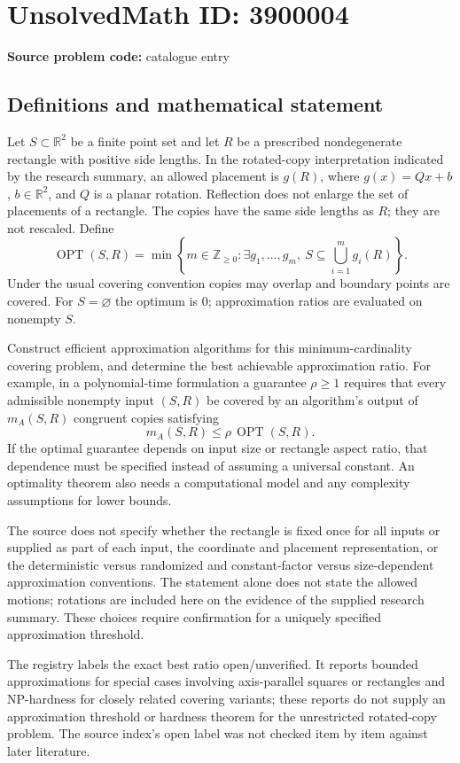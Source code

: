 \documentclass[11pt]{article}
\begin{document}
\section*{UnsolvedMath ID: 3900004}
\textbf{Source problem code:} catalogue entry
\subsection{Definitions and mathematical statement}
Let \(S\subset\mathbb R^2\) be a finite point set and let \(R\) be a prescribed nondegenerate rectangle with positive side lengths. In the rotated-copy interpretation indicated by the research summary, an allowed placement is \(g(R)\), where \(g(x)=Qx+b\), \(b\in\mathbb R^2\), and \(Q\) is a planar rotation. Reflection does not enlarge the set of placements of a rectangle. The copies have the same side lengths as \(R\); they are not rescaled. Define
\[
 \operatorname{OPT}(S,R)=\min\left\{m\in\mathbb Z_{\ge0}:\exists g_1,\ldots,g_m,
 \ S\subseteq\bigcup_{i=1}^m g_i(R)\right\}.
\]
Under the usual covering convention copies may overlap and boundary points are covered. For \(S=\varnothing\) the optimum is \(0\); approximation ratios are evaluated on nonempty \(S\).

Construct efficient approximation algorithms for this minimum-cardinality covering problem, and determine the best achievable approximation ratio. For example, in a polynomial-time formulation a guarantee \(\rho\ge1\) requires that every admissible nonempty input \((S,R)\) be covered by an algorithm's output of \(m_A(S,R)\) congruent copies satisfying
\[
 m_A(S,R)\le\rho\,\operatorname{OPT}(S,R).
\]
If the optimal guarantee depends on input size or rectangle aspect ratio, that dependence must be specified instead of assuming a universal constant. An optimality theorem also needs a computational model and any complexity assumptions for lower bounds.

The source does not specify whether the rectangle is fixed once for all inputs or supplied as part of each input, the coordinate and placement representation, or the deterministic versus randomized and constant-factor versus size-dependent approximation conventions. The statement alone does not state the allowed motions; rotations are included here on the evidence of the supplied research summary. These choices require confirmation for a uniquely specified approximation threshold.

The registry labels the exact best ratio open/unverified. It reports bounded approximations for special cases involving axis-parallel squares or rectangles and NP-hardness for closely related covering variants; these reports do not supply an approximation threshold or hardness theorem for the unrestricted rotated-copy problem. The source index's open label was not checked item by item against later literature.
\end{document}
